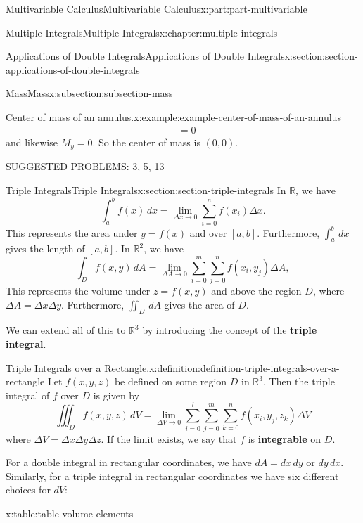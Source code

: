 \documentclass[twoside,10pt,]{book}
\newcommand{\terminology}[1]{\textbf{#1}}
\numberwithin{equation}{part}
\newcommand{\RR}{\mathbb{R}}
\begin{document}
\begin{partptx}{Multivariable Calculus}{}{Multivariable Calculus}{}{}{x:part:part-multivariable}
\begin{chapterptx}{Multiple Integrals}{}{Multiple Integrals}{}{}{x:chapter:multiple-integrals}
\begin{sectionptx}{Applications of Double Integrals}{}{Applications of Double Integrals}{}{}{x:section:section-applications-of-double-integrals}
\begin{subsectionptx}{Mass}{}{Mass}{}{}{x:subsection:subsection-mass}
\begin{example}{Center of mass of an annulus.}{x:example:example-center-of-mass-of-an-annulus}
\begin{align*}
& = 0 
\end{align*}
and likewise \(M_{y} = 0\). So the center of mass is \((0,0)\).%
\end{example}
\end{subsectionptx}
\begin{conclusion}{}%
SUGGESTED PROBLEMS: 3, 5, 13%
\end{conclusion}%
\end{sectionptx}
%
%
\typeout{************************************************}
\typeout{************************************************}
%
\begin{sectionptx}{Triple Integrals}{}{Triple Integrals}{}{}{x:section:section-triple-integrals}
In \(\RR\), we have%
\begin{equation*}
\int_{a}^{b}f(x)\,dx = \lim_{\Delta x\to0}\sum_{i=0}^{n}f(x_{i})\Delta x.
\end{equation*}
This represents the area under \(y=f(x)\) and over \([a,b]\). Furthermore, \(\int_{a}^{b}\,dx\) gives the length of \([a,b]\). In \(\mathbb{R}^{2}\), we have%
\begin{equation*}
\int_{D}f(x,y)\,dA = \lim_{\Delta A\to0}\sum_{i=0}^{m}\sum_{j=0}^{n}f(x_{i},y_{j})\Delta A,
\end{equation*}
This represents the volume under \(z = f(x,y)\) and above the region \(D\), where \(\Delta A = \Delta x\Delta y\). Furthermore, \(\iint_{D}\,dA\) gives the area of \(D\).%
\par
We can extend all of this to \(\RR^{3}\) by introducing the concept of the \terminology{triple integral}.%
\begin{definition}{Triple Integrals over a Rectangle.}{x:definition:definition-triple-integrals-over-a-rectangle}%
%
Let \(f(x,y,z)\) be defined on some region \(D\) in \(\RR^{3}\). Then the triple integral of \(f\) over \(D\) is given by%
\begin{equation*}
\iiint_{D}f(x,y,z)\,dV = \lim_{\Delta V\to0}\sum_{i=0}^{l}\sum_{j=0}^{m}\sum_{k=0}^{n}f(x_{i},y_{j},z_{k})\Delta V
\end{equation*}
where \(\Delta V = \Delta x\Delta y\Delta z\). If the limit exists, we say that \(f\) is \terminology{integrable} on \(D\).%
\end{definition}
For a double integral in rectangular coordinates, we have \(dA = dx\,dy\) or \(dy\,dx\). Similarly, for a triple integral in rectangular coordinates we have six different choices for \(dV\): \begin{tableptx}{\textbf{}}{x:table:table-volume-elements}{}%

\end{tableptx}
\end{sectionptx}
\end{chapterptx}
\end{partptx}
\end{document}
